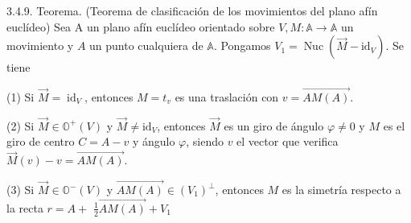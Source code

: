 \documentclass[12pt, a4paper, ones, notitlepage, openany,titlepage]{article}
\begin{document}
3.4.9. Teorema. (Teorema de clasificación de los movimientos del plano afín euclídeo) Sea A un plano afín euclídeo orientado sobre $V, M: \mathbb{A} \rightarrow \mathbb{A}$ un movimiento y $A$ un punto cualquiera de $\mathbb{A}$. Pongamos $V_{1}=\operatorname{Nuc}\left(\vec{M}-\mathrm{id}_{V}\right)$. Se tiene

(1) Si $\vec{M}=\operatorname{id}_{V}$, entonces $M=t_{v}$ es una traslación con $v=\overrightarrow{A M(A)}$.

(2) Si $\vec{M} \in \mathbb{O}^{+}(V)$ y $\vec{M} \neq \mathrm{id}_{V}$, entonces $\vec{M}$ es un giro de ángulo $\varphi \neq 0$ y $M$ es el giro de centro $C=A-v$ y ángulo $\varphi$, siendo $v$ el vector que verifica $\vec{M}(v)-v=\overrightarrow{A M(A)}$.

(3) Si $\vec{M} \in \mathbb{O}^{-}(V)$ y $\overrightarrow{A M(A)} \in\left(V_{1}\right)^{\perp}$, entonces $M$ es la simetría respecto a la recta $r=A+$ $\frac{1}{2} \overrightarrow{A M(A)}+V_{1}$
\end{document}
